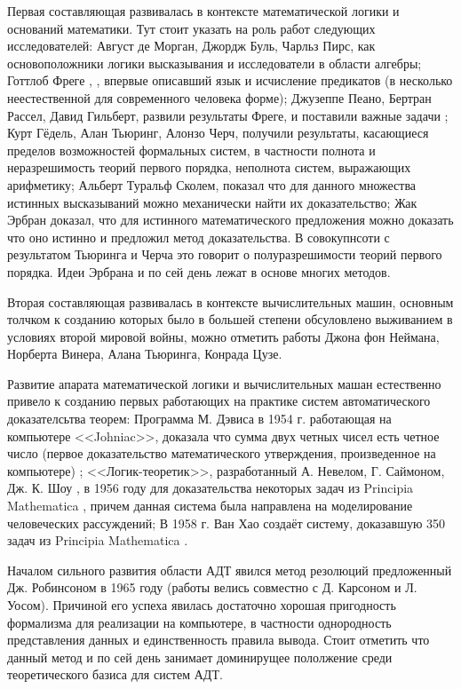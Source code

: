 Первая составляющая развивалась в контексте математической логики и оснований математики. Тут стоит указать на роль работ следующих исследователей: Август де Морган, Джордж Буль, Чарльз Пирс, как основоположники логики высказывания и исследователи в области алгебры; Готтлоб Фреге \cite{Frege}, \cite{Sourcebook}, впервые описавший язык и исчисление предикатов (в несколько неестественной для современного человека форме); Джузеппе Пеано, Бертран Рассел, Давид Гильберт, развили результаты Фреге, и поставили важные задачи \cite{GilbertAkkerman}; Курт Гёдель, Алан Тьюринг, Алонзо Черч, получили результаты, касающиеся пределов возможностей формальных систем, в частности полнота \cite{Godel1929}  и неразрешимость теорий первого порядка, неполнота систем, выражающих арифметику; Альберт Туральф Сколем, показал что для данного множества истинных высказываний можно механически найти их доказательство; Жак Эрбран доказал, что для истинного математического предложения можно доказать что оно истинно и предложил метод доказательства. В совокупнсоти с результатом Тьюринга и Черча это говорит о полуразрешимости теорий первого порядка. 
Идеи Эрбрана и по сей день лежат в основе многих методов. 

Вторая составляющая развивалась в контексте вычислительных машин, основным толчком к созданию которых было в большей степени обсуловлено выживанием в условиях второй мировой войны, можно отметить работы Джона фон Неймана, Норберта Винера, Алана Тьюринга, Конрада Цузе. 
 
Развитие апарата математической логики и вычислительных машан естественно привело к созданию первых работающих на практике систем автоматического доказателсьтва теорем: Программа М. Дэвиса в 1954 г. работающая на компьютере <<Johniac>>, доказала что сумма двух четных чисел есть четное число (первое доказательство математического утверждения, произведенное на компьютере) \cite{LogicComp}; <<Логик-теоретик>>, разработанный А. Невелом, Г. Саймоном, Дж. К. Шоу \cite{Newell1}, \cite{Newell2} в 1956 году для доказательства некоторых задач из Principia Mathematica \cite{PrinMat}, причем данная система была направлена на моделирование человеческих рассуждений; В 1958 г. Ван Хао создаёт систему, доказавшую 350 задач из Principia Mathematica \cite{WangHao}.

Началом сильного развития области АДТ явился метод резолюций \cite{Robinson_1965} предложенный Дж. Робинсоном в 1965 году (работы велись совместно с Д. Карсоном и Л. Уосом). Причиной его успеха явилась достаточно хорошая пригодность формализма для реализации на компьютере, в частности однородность представления данных и единственность правила вывода. Стоит отметить что данный метод и по сей день занимает доминирущее пололжение среди теоретического базиса для систем АДТ.

